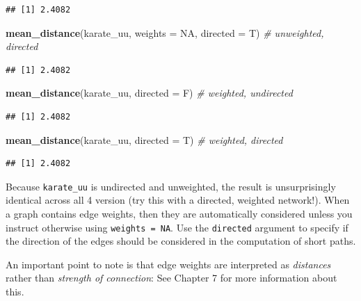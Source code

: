 \documentclass[
]{book}
\newenvironment{Shaded}{\begin{snugshade}}{\end{snugshade}}
\newcommand{\AttributeTok}[1]{\textcolor[rgb]{0.13,0.29,0.53}{#1}}
\newcommand{\CommentTok}[1]{\textcolor[rgb]{0.56,0.35,0.01}{\textit{#1}}}
\newcommand{\ConstantTok}[1]{\textcolor[rgb]{0.56,0.35,0.01}{#1}}
\newcommand{\FunctionTok}[1]{\textcolor[rgb]{0.13,0.29,0.53}{\textbf{#1}}}
\newcommand{\NormalTok}[1]{#1}
\begin{document}
\begin{verbatim}
## [1] 2.4082
\end{verbatim}

\begin{Shaded}
\begin{Highlighting}[]
\FunctionTok{mean\_distance}\NormalTok{(karate\_uu, }\AttributeTok{weights =} \ConstantTok{NA}\NormalTok{, }\AttributeTok{directed =}\NormalTok{ T) }\CommentTok{\# unweighted, directed }
\end{Highlighting}
\end{Shaded}

\begin{verbatim}
## [1] 2.4082
\end{verbatim}

\begin{Shaded}
\begin{Highlighting}[]
\FunctionTok{mean\_distance}\NormalTok{(karate\_uu, }\AttributeTok{directed =}\NormalTok{ F) }\CommentTok{\# weighted, undirected}
\end{Highlighting}
\end{Shaded}

\begin{verbatim}
## [1] 2.4082
\end{verbatim}

\begin{Shaded}
\begin{Highlighting}[]
\FunctionTok{mean\_distance}\NormalTok{(karate\_uu, }\AttributeTok{directed =}\NormalTok{ T) }\CommentTok{\# weighted, directed }
\end{Highlighting}
\end{Shaded}

\begin{verbatim}
## [1] 2.4082
\end{verbatim}

Because \texttt{karate\_uu} is undirected and unweighted, the result is unsurprisingly identical across all 4 version (try this with a directed, weighted network!). When a graph contains edge weights, then they are automatically considered unless you instruct otherwise using \texttt{weights\ =\ NA}. Use the \texttt{directed} argument to specify if the direction of the edges should be considered in the computation of short paths.

An important point to note is that edge weights are interpreted as \emph{distances} rather than \emph{strength of connection}: See Chapter 7 for more information about this.
\end{document}
